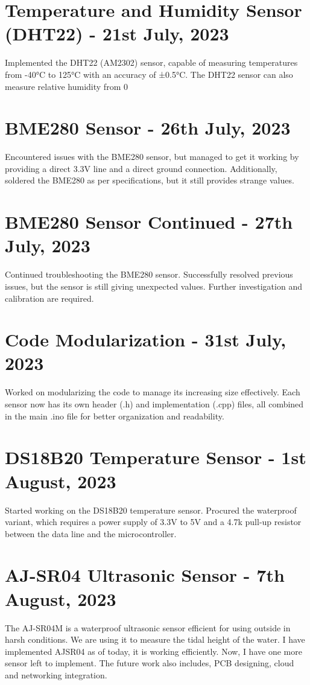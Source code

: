 \documentclass{article}
\begin{document}
\section*{Temperature and Humidity Sensor (DHT22) - 21st July, 2023}
Implemented the DHT22 (AM2302) sensor, capable of measuring temperatures from -40°C to 125°C with an accuracy of ±0.5°C. The DHT22 sensor can also measure relative humidity from 0%

\section*{BME280 Sensor - 26th July, 2023}
Encountered issues with the BME280 sensor, but managed to get it working by providing a direct 3.3V line and a direct ground connection. Additionally, soldered the BME280 as per specifications, but it still provides strange values.

\section*{BME280 Sensor Continued - 27th July, 2023}
Continued troubleshooting the BME280 sensor. Successfully resolved previous issues, but the sensor is still giving unexpected values. Further investigation and calibration are required.

\section*{Code Modularization - 31st July, 2023}
Worked on modularizing the code to manage its increasing size effectively. Each sensor now has its own header (.h) and implementation (.cpp) files, all combined in the main .ino file for better organization and readability.

\section*{DS18B20 Temperature Sensor - 1st August, 2023}
Started working on the DS18B20 temperature sensor. Procured the waterproof variant, which requires a power supply of 3.3V to 5V and a 4.7k pull-up resistor between the data line and the microcontroller.

\section*{AJ-SR04 Ultrasonic Sensor - 7th August, 2023}
The AJ-SR04M is a waterproof ultrasonic sensor efficient for using outside in harsh conditions. We are using it to measure the tidal height of the water. I have implemented AJSR04 as of today, it is working efficiently. Now, I have one more sensor left to implement. The future work also includes, PCB designing, cloud and networking integration.
\end{document}
